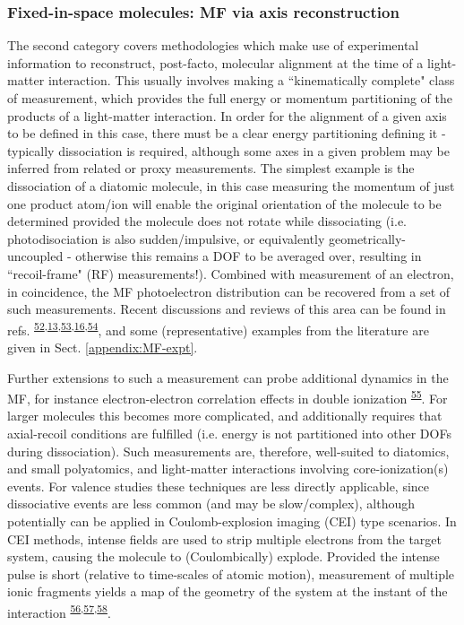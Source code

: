 \documentclass[10pt]{article}
\begin{document}
\subsubsection{Fixed-in-space molecules: MF via axis reconstruction\label{sec:fixed-in-space}}

The second category covers methodologies which make use of experimental information to reconstruct, post-facto, molecular alignment at the time of a light-matter interaction. This usually involves making a ``kinematically complete" class of measurement, which provides the full energy or momentum partitioning of the products of a light-matter interaction. In order for the alignment of a given axis to be defined in this case, there must be a clear energy partitioning defining it - typically dissociation is required, although some axes in a given problem may be inferred from related or proxy measurements. The simplest example is the dissociation of a diatomic molecule, in this case measuring the momentum of just one product atom/ion will enable the original orientation of the molecule to be determined 
provided the molecule does not rotate while dissociating (i.e. photodisociation is also sudden/impulsive, or equivalently geometrically-uncoupled - otherwise this remains a DOF to be averaged over, resulting in ``recoil-frame" (RF) measurements!). Combined with measurement of an electron, in coincidence, the MF photoelectron distribution can be recovered from a set of such measurements. Recent discussions and reviews of this area can be found in refs. \textsuperscript{\hyperref[csl:52]{52},\hyperref[csl:13]{13},\hyperref[csl:53]{53},\hyperref[csl:16]{16},\hyperref[csl:54]{54}}, and some (representative) examples from the literature are given in Sect. \ref{appendix:MF-expt}.


Further extensions to such a measurement can probe additional dynamics in the MF, for instance electron-electron correlation effects in double ionization \textsuperscript{\hyperref[csl:55]{55}}. %
For larger molecules this becomes more complicated, and additionally requires that axial-recoil conditions are fulfilled (i.e. energy is not partitioned into other DOFs during dissociation). Such measurements are, therefore, well-suited to diatomics, and small polyatomics, and light-matter interactions involving core-ionization(s) events. For valence studies these techniques are less directly applicable, since dissociative events are less common (and may be slow/complex), although potentially can be applied in Coulomb-explosion imaging (CEI) type scenarios. In CEI methods, intense fields are used to strip multiple electrons from the target system, causing the molecule to (Coulombically) explode. Provided the intense pulse is short (relative to time-scales of atomic motion), measurement of multiple ionic fragments yields a map of the geometry of the system at the instant of the interaction \textsuperscript{\hyperref[csl:56]{56},\hyperref[csl:57]{57},\hyperref[csl:58]{58}}. 
\end{document}
